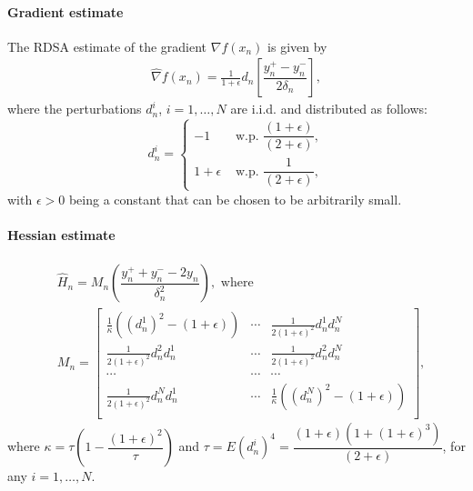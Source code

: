 \documentclass[letterpaper, 10 pt, conference]{ieeeconf}  %
\begin{document}
\paragraph{\textbf{Gradient estimate}}
The RDSA estimate of the gradient $\nabla f(x_n)$ is given by
\begin{align}
\label{eq:grad-ber}
\widehat\nabla f(x_n) = \frac1{1+\epsilon} d_n \left[ \dfrac{y_n^+ - y_n^-}{2\delta_n}\right],
\end{align}
where the perturbations $d_n^i$, $i=1,\ldots,N$ are i.i.d. and distributed  as follows: 
\begin{equation}
\label{eq:det-proj}
 d_n^i =
  \begin{cases}
   -1 &  \text{ w.p. } \dfrac{(1+\epsilon)}{(2+\epsilon)}, \\
   1+\epsilon &  \text{ w.p. } \dfrac{1}{(2+\epsilon)},
  \end{cases}
\end{equation}
with $\epsilon>0$ being a constant that can be chosen to be arbitrarily small.

\paragraph{\textbf{Hessian estimate}}

\begin{align}
\label{eq:2rdsa-estimate-ber}
&\widehat H_n = M_n \left(\dfrac{y_n^+ + y_n^- - 2 y_n}{\delta_n^2}\right), \text{ where }\\
& M_n =
\left[
\begin{array}{ccc}
\frac{1}{\kappa}\left((d_n^1)^2\!-(1+\epsilon)\right) & \cdots & \frac{1}{2(1+\epsilon)^2}d_n^1 d_n^N\\
\frac{1}{2(1+\epsilon)^2}d_n^2 d_n^1  &  \cdots & \frac{1}{2(1+\epsilon)^2}d_n^2 d_n^N\\
\cdots&\cdots&\cdots\\
\frac{1}{2(1+\epsilon)^2}d_n^N d_n^1 & \cdots &  \frac{1}{\kappa}\left((d_n^N)^2-(1+\epsilon)\right) \\
\end{array}
\right],\nonumber
\end{align}
where $\kappa = \tau \left(1- \dfrac{(1+\epsilon)^2}{\tau}\right)$ and $\tau = E (d_n^i)^4= \dfrac{(1+\epsilon)(1+(1+\epsilon)^3)}{(2+\epsilon)}$, for any $i=1,\ldots,N$. 
\end{document}
